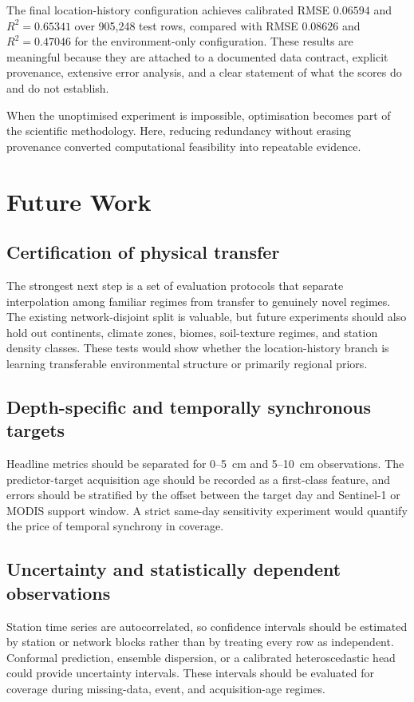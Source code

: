 \documentclass[12pt,a4paper]{report}
\newcommand{\feat}[1]{#1\par}
\begin{document}
The final location-history configuration achieves calibrated RMSE
$0.06594$ and $R^2=0.65341$ over 905,248 test rows, compared with RMSE
$0.08626$ and $R^2=0.47046$ for the environment-only configuration. These
results are meaningful because they are attached to a documented data contract,
explicit provenance, extensive error analysis, and a clear statement of what
the scores do and do not establish.

\feat{When the unoptimised experiment is impossible, optimisation becomes part
of the scientific methodology. Here, reducing redundancy without erasing
provenance converted computational feasibility into repeatable evidence.}

\chapter{Future Work}

\section{Certification of physical transfer}
The strongest next step is a set of evaluation protocols that separate
interpolation among familiar regimes from transfer to genuinely novel regimes.
The existing network-disjoint split is valuable, but future experiments should
also hold out continents, climate zones, biomes, soil-texture regimes, and
station density classes. These tests would show whether the location-history
branch is learning transferable environmental structure or primarily regional
priors.

\section{Depth-specific and temporally synchronous targets}
Headline metrics should be separated for 0--5~cm and 5--10~cm observations.
The predictor-target acquisition age should be recorded as a first-class
feature, and errors should be stratified by the offset between the target day
and Sentinel-1 or MODIS support window. A strict same-day sensitivity experiment
would quantify the price of temporal synchrony in coverage.

\section{Uncertainty and statistically dependent observations}
Station time series are autocorrelated, so confidence intervals should be
estimated by station or network blocks rather than by treating every row as
independent. Conformal prediction, ensemble dispersion, or a calibrated
heteroscedastic head could provide uncertainty intervals. These intervals
should be evaluated for coverage during missing-data, event, and acquisition-age
regimes.
\end{document}
